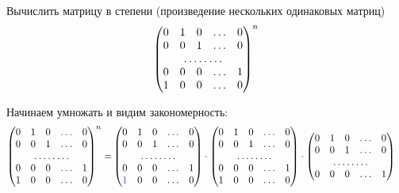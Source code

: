 \documentclass[a4paper,12pt]{article}
\begin{document}
  \begin{problem}[15.11(9)]
    Вычислить матрицу в степени (произведение нескольких одинаковых матриц)
    \[
      \begin{pmatrix}
        0 & 1 & 0 & \ldots & 0\\
        0 & 0 & 1 & \ldots & 0\\
        \hdotsfor{5}\\
        0 & 0 & 0 & \ldots & 1\\
        1 & 0 & 0 & \ldots & 0
      \end{pmatrix}^n
    \]
  \end{problem}
  
  \begin{solution}
    Начинаем умножать и видим закономерность:
    \begin{equation*}
    \begin{split}
      \begin{pmatrix}
        0 & 1 & 0 & \ldots & 0\\
        0 & 0 & 1 & \ldots & 0\\
        \hdotsfor{5}\\
        0 & 0 & 0 & \ldots & 1\\
        1 & 0 & 0 & \ldots & 0
      \end{pmatrix}^n
      = &\begin{pmatrix}
        0 & 1 & 0 & \ldots & 0\\
        0 & 0 & 1 & \ldots & 0\\
        \hdotsfor{5}\\
        0 & 0 & 0 & \ldots & 1\\
        \textcolor{light-purple}{1} & 0 & 0 & \ldots & 0
        \end{pmatrix}
        \cdot \begin{pmatrix}
        0 & 1 & 0 & \ldots & 0\\
        0 & 0 & 1 & \ldots & 0\\
        \hdotsfor{5}\\
        0 & 0 & 0 & \ldots & 1\\
        1 & 0 & 0 & \ldots & 0
        \end{pmatrix}
        \cdot \begin{pmatrix}
          0 & 1 & 0 & \ldots & 0\\
          0 & 0 & 1 & \ldots & 0\\
          \hdotsfor{5}\\
          0 & 0 & 0 & \ldots & 1\\

\end{pmatrix}
\end{split}
\end{equation*}
\end{solution}
\end{document}
